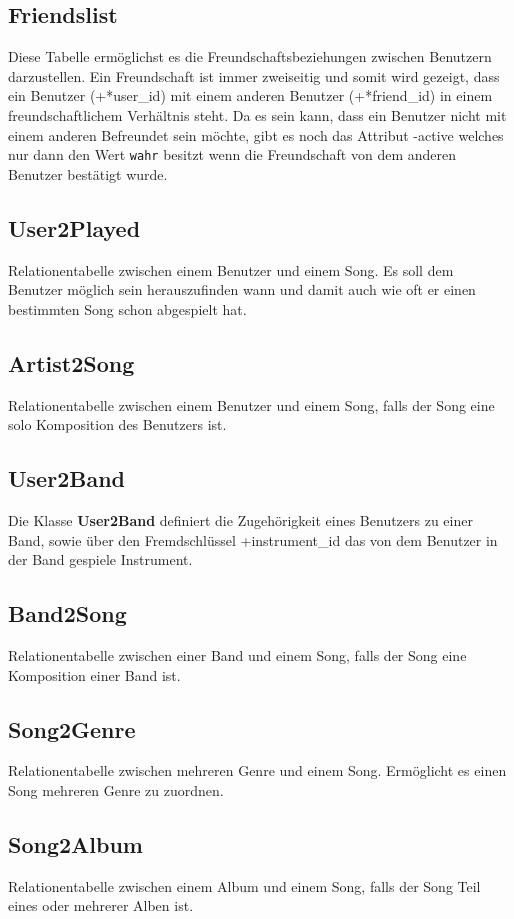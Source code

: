 \documentclass[11pt,a4paper,DIV=9]{scrartcl}
\begin{document}
  \subsection{Friendslist}
    Diese Tabelle ermöglichst es die Freundschaftsbeziehungen zwischen Benutzern darzustellen. Ein Freundschaft ist immer zweiseitig und somit wird gezeigt, dass ein Benutzer (+*user\_id) mit einem anderen Benutzer (+*friend\_id) in einem freundschaftlichem Verhältnis steht. Da es sein kann, dass ein Benutzer nicht mit einem anderen Befreundet sein möchte, gibt es noch das Attribut -active welches nur dann den Wert \texttt{wahr} besitzt wenn die Freundschaft von dem anderen Benutzer bestätigt wurde.
  \subsection{User2Played}
    Relationentabelle zwischen einem Benutzer und einem Song. Es soll dem Benutzer möglich sein herauszufinden wann und damit auch wie oft er einen bestimmten Song schon abgespielt hat.
  \subsection{Artist2Song}
    Relationentabelle zwischen einem Benutzer und einem Song, falls der Song eine solo Komposition des Benutzers ist.
  \subsection{User2Band}
    Die Klasse \textbf{User2Band} definiert die Zugehörigkeit eines Benutzers zu einer Band, sowie über den Fremdschlüssel +instrument\_id das von dem Benutzer in der Band gespiele Instrument.
  \subsection{Band2Song}
    Relationentabelle zwischen einer Band und einem Song, falls der Song eine Komposition einer Band ist.
  \subsection{Song2Genre}
    Relationentabelle zwischen mehreren Genre und einem Song. Ermöglicht es einen Song mehreren Genre zu zuordnen.
  \subsection{Song2Album}
    Relationentabelle zwischen einem Album und einem Song, falls der Song Teil eines oder mehrerer Alben ist.
\end{document}
